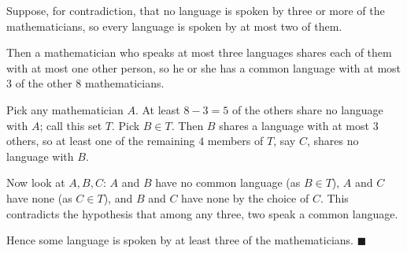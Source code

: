 Suppose, for contradiction, that no language is spoken by three or more of the mathematicians, so every language is spoken by at most two of them.

Then a mathematician who speaks at most three languages shares each of them with at most one other person, so he or she has a common language with at most $3$ of the other $8$ mathematicians.

Pick any mathematician $A$. At least $8-3=5$ of the others share no language with $A$; call this set $T$. Pick $B\in T$. Then $B$ shares a language with at most $3$ others, so at least one of the remaining $4$ members of $T$, say $C$, shares no language with $B$.

Now look at $A,B,C$: $A$ and $B$ have no common language (as $B\in T$), $A$ and $C$ have none (as $C\in T$), and $B$ and $C$ have none by the choice of $C$. This contradicts the hypothesis that among any three, two speak a common language.

Hence some language is spoken by at least three of the mathematicians. $\blacksquare$
